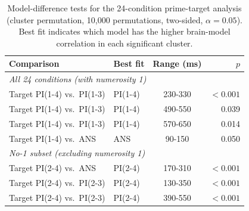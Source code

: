 \begin{table}[!tbp]
  \centering
  \caption{Model-difference tests for the 24-condition prime-target analysis
  (cluster permutation, 10,000 permutations, two-sided, $\alpha = 0.05$).
  Best fit indicates which model has the higher brain-model correlation
  in each significant cluster.}
  \label{tab:model-differences}
  \small
  \begin{tabular}{@{}llcr@{}}
    \toprule
    Comparison & Best fit & Range (ms) & $p$ \\
    \midrule
    \multicolumn{4}{l}{\textit{All 24 conditions (with numerosity 1)}} \\
    Target PI(1-4) vs.\ PI(1-3) & PI(1-4) & 230-330 & $<0.001$ \\
    Target PI(1-4) vs.\ PI(1-3) & PI(1-4) & 490-550 & 0.039 \\
    Target PI(1-4) vs.\ PI(1-3) & PI(1-4) & 570-650 & 0.014 \\
    Target PI(1-4) vs.\ ANS     & ANS     & 90-150  & 0.050 \\
    \midrule
    \multicolumn{4}{l}{\textit{No-1 subset (excluding numerosity 1)}} \\
    Target PI(2-4) vs.\ ANS     & PI(2-4) & 170-310 & $<0.001$ \\
    Target PI(2-4) vs.\ PI(2-3) & PI(2-4) & 130-350 & $<0.001$ \\
    Target PI(2-4) vs.\ PI(2-3) & PI(2-4) & 390-550 & $<0.001$ \\
    \bottomrule
  \end{tabular}
\end{table}
